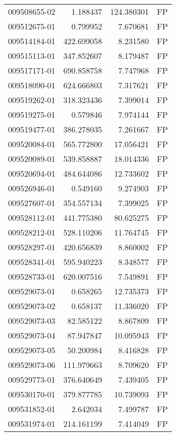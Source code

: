 \begin{tabular}{lrrl}
009508655-02 &    1.188437 &   124.380301 &   FP \\
009512675-01 &    0.799952 &     7.670681 &   FP \\
009514184-01 &  422.699058 &     8.231580 &   FP \\
009515113-01 &  347.852607 &     8.179487 &   FP \\
009517171-01 &  690.858758 &     7.747968 &   FP \\
009518090-01 &  624.666803 &     7.317621 &   FP \\
009519262-01 &  318.323436 &     7.399014 &   FP \\
009519275-01 &    0.579846 &     7.974144 &   FP \\
009519477-01 &  386.278035 &     7.261667 &   FP \\
009520084-01 &  565.772800 &    17.056421 &   FP \\
009520089-01 &  539.858887 &    18.014336 &   FP \\
009520694-01 &  484.644086 &    12.733602 &   FP \\
009526946-01 &    0.549160 &     9.274903 &   FP \\
009527607-01 &  354.557134 &     7.399025 &   FP \\
009528112-01 &  441.775380 &    80.625275 &   FP \\
009528212-01 &  528.110206 &    11.764745 &   FP \\
009528297-01 &  420.656839 &     8.860002 &   FP \\
009528341-01 &  595.940223 &     8.348577 &   FP \\
009528733-01 &  620.007516 &     7.549891 &   FP \\
009529073-01 &    0.658265 &    12.735373 &   FP \\
009529073-02 &    0.658137 &    11.336020 &   FP \\
009529073-03 &   82.585122 &     8.867809 &   FP \\
009529073-04 &   87.947847 &    10.095943 &   FP \\
009529073-05 &   50.200984 &     8.416828 &   FP \\
009529073-06 &  111.979663 &     8.709620 &   FP \\
009529773-01 &  376.640649 &     7.439405 &   FP \\
009530170-01 &  379.877785 &    10.739093 &   FP \\
009531852-01 &    2.642034 &     7.499787 &   FP \\
009531974-01 &  214.161199 &     7.414049 &   FP \\

\end{tabular}
